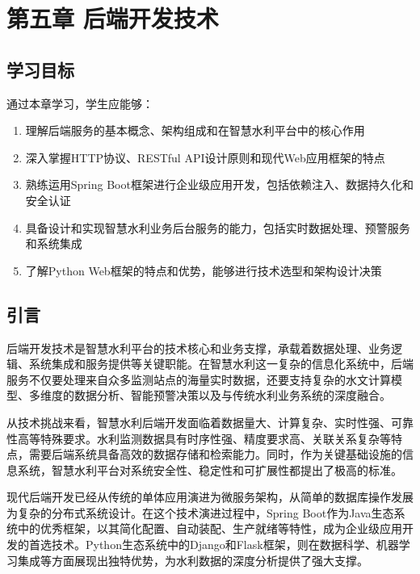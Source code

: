 \section{第五章 后端开发技术}\label{ux7b2cux4e94ux7ae0-ux540eux7aefux5f00ux53d1ux6280ux672f}

\subsection{学习目标}\label{ux5b66ux4e60ux76eeux6807}

通过本章学习，学生应能够：

\begin{enumerate}
\def\labelenumi{\arabic{enumi}.}
\tightlist
\item
  理解后端服务的基本概念、架构组成和在智慧水利平台中的核心作用
\item
  深入掌握HTTP协议、RESTful API设计原则和现代Web应用框架的特点
\item
  熟练运用Spring Boot框架进行企业级应用开发，包括依赖注入、数据持久化和安全认证
\item
  具备设计和实现智慧水利业务后台服务的能力，包括实时数据处理、预警服务和系统集成
\item
  了解Python Web框架的特点和优势，能够进行技术选型和架构设计决策
\end{enumerate}

\subsection{引言}\label{ux5f15ux8a00}

后端开发技术是智慧水利平台的技术核心和业务支撑，承载着数据处理、业务逻辑、系统集成和服务提供等关键职能。在智慧水利这一复杂的信息化系统中，后端服务不仅要处理来自众多监测站点的海量实时数据，还要支持复杂的水文计算模型、多维度的数据分析、智能预警决策以及与传统水利业务系统的深度融合。

从技术挑战来看，智慧水利后端开发面临着数据量大、计算复杂、实时性强、可靠性高等特殊要求。水利监测数据具有时序性强、精度要求高、关联关系复杂等特点，需要后端系统具备高效的数据存储和检索能力。同时，作为关键基础设施的信息系统，智慧水利平台对系统安全性、稳定性和可扩展性都提出了极高的标准。

现代后端开发已经从传统的单体应用演进为微服务架构，从简单的数据库操作发展为复杂的分布式系统设计。在这个技术演进过程中，Spring Boot作为Java生态系统中的优秀框架，以其简化配置、自动装配、生产就绪等特性，成为企业级应用开发的首选技术。Python生态系统中的Django和Flask框架，则在数据科学、机器学习集成等方面展现出独特优势，为水利数据的深度分析提供了强大支撑。

